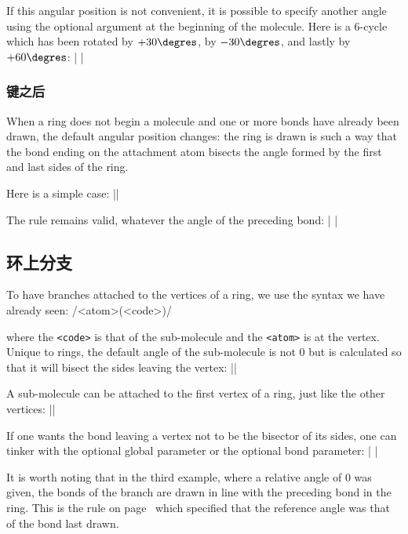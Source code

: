 \documentclass[10pt]{article}
\begin{document}
If this angular position is not convenient, it is possible to specify another angle using the optional argument at the beginning of the molecule. Here is a 6-cycle which has been rotated by $+30\degres$, by $-30\degres$, and lastly by $+60\degres$:
|\qquad
	\qquad
	|

\subsubsection{键之后}
When a ring does not begin a molecule and one or more bonds have already been drawn, the default angular position changes: the ring is drawn is such a way that the bond ending on the attachment atom bisects the angle formed by the first and last sides of the ring.

Here is a simple case:
||

The rule remains valid, whatever the angle of the preceding bond:
|\vskip5pt
	|

\subsection{环上分支}
To have branches attached to the vertices of a ring, we use the syntax we have already seen:
\centerverb/<atom>(<code>)/
\smallskip

where the \verb/<code>/ is that of the sub-molecule and the \verb-<atom>- is at the vertex. Unique to rings, the default angle of the sub-molecule is not 0\degres{} but is calculated so that it will bisect the sides leaving the vertex:
||

A sub-molecule can be attached to the first vertex of a ring, just like the other vertices:
||

If one wants the bond leaving a vertex not to be the bisector of its sides, one can tinker with the optional global parameter or the optional bond parameter:
|\qquad
	\qquad
	|

It is worth noting that in the third example, where a relative angle of 0\degres{} was given, the bonds of the branch are drawn in line with the preceding bond in the ring. This is the rule on page~\pageref{angle.relatif} which specified that the reference angle was that of the bond last drawn.
\end{document}
